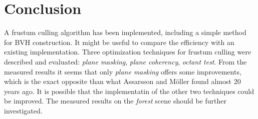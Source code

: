 \documentclass[report,11pt]{elsarticle}
\begin{document}
\section{\label{SEC:Conclusion}Conclusion}
A frustum culling algorithm has been implemented, including a simple method for BVH construction. It might be useful to compare the efficiency with an existing implementation. Three optimization techniques for frustum culling were described and evaluated: \emph{plane masking}, \emph{plane coherency}, \emph{octant test}. From the measured results it seems that only \emph{plane masking} offers some improvements, which is the exact opposite than what Assarsson and Möller \cite{TODO} found almost 20 years ago. It is possible that the implementatin of the other two techniques could be improved. The measured results on the \emph{forest} scene should be further investigated. 



%
%
%
\end{document}
